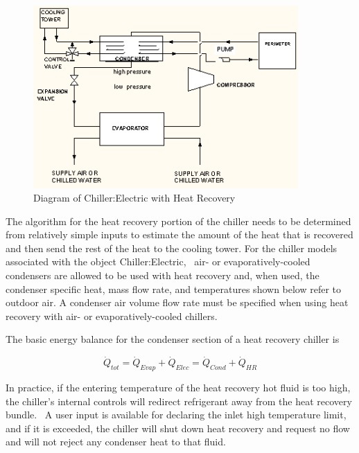 \begin{figure}[hbtp] %
\centering
\includegraphics[width=0.9\textwidth, height=0.9\textheight, keepaspectratio=true]{media/image3175.png}
\caption{  Diagram of Chiller:Electric with Heat Recovery \protect \label{fig:diagram-of-chiller-electric-with-heat}}
\end{figure}

The algorithm for the heat recovery portion of the chiller needs to be determined from relatively simple inputs to estimate the amount of the heat that is recovered and then send the rest of the heat to the cooling tower. For the chiller models associated with the object Chiller:Electric,~ air- or evaporatively-cooled condensers are allowed to be used with heat recovery and, when used, the condenser specific heat, mass flow rate, and temperatures shown below refer to outdoor air. A condenser air volume flow rate must be specified when using heat recovery with air- or evaporatively-cooled chillers.

The basic energy balance for the condenser section of a heat recovery chiller is

\begin{equation}
{\dot Q_{tot}} = {\dot Q_{Evap}} + {\dot Q_{Elec}} = {\dot Q_{Cond}} + {\dot Q_{HR}}
\end{equation}

In practice, if the entering temperature of the heat recovery hot fluid is too high, the chiller's internal controls will redirect refrigerant away from the heat recovery bundle.~ A user input is available for declaring the inlet high temperature limit, and if it is exceeded, the chiller will shut down heat recovery and request no flow and will not reject any condenser heat to that fluid.

